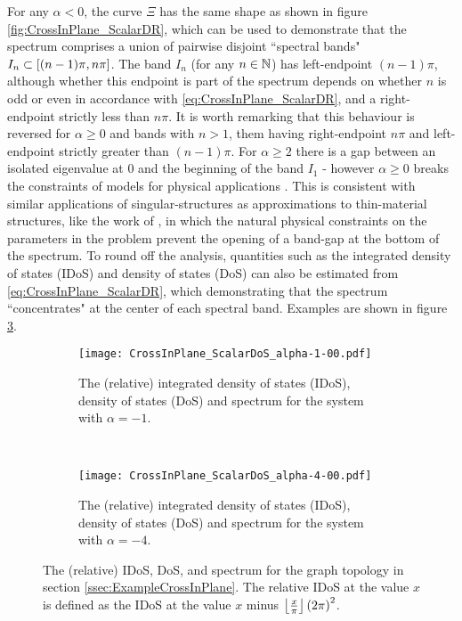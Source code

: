 For any $\alpha<0$, the curve $\Xi$ has the same shape as shown in figure \ref{fig:CrossInPlane_ScalarDR}, which can be used to demonstrate that the spectrum comprises a union of pairwise disjoint ``spectral bands" $I_n\subset\left[ (n-1)\pi, n\pi \right]$.
The band $I_n$ (for any $n\in\mathbb{N}$) has left-endpoint $(n-1)\pi$, although whether this endpoint is part of the spectrum depends on whether $n$ is odd or even in accordance with \eqref{eq:CrossInPlane_ScalarDR}, and a right-endpoint strictly less than $n\pi$.
It is worth remarking that this behaviour is reversed for $\alpha\geq 0$ and bands with $n>1$, them having right-endpoint $n\pi$ and left-endpoint strictly greater than $(n-1)\pi$.
For $\alpha\geq2$ there is a gap between an isolated eigenvalue at $0$ and the beginning of the band $I_1$ - however $\alpha\geq0$ breaks the constraints of models for physical applications .
This is consistent with similar applications of singular-structures as approximations to thin-material structures, like the work of \cite{cherednichenko2019time}, in which the natural physical constraints on the parameters in the problem prevent the opening of a band-gap at the bottom of the spectrum.
To round off the analysis, quantities such as the integrated density of states (IDoS) and density of states (DoS) can also be estimated from \eqref{eq:CrossInPlane_ScalarDR}, which demonstrating that the spectrum ``concentrates" at the center of each spectral band.
Examples are shown in figure \ref{fig:CrossInPlane_ScalarDoS}.
\begin{figure}[h]
	\begin{subfigure}[t]{0.45\textwidth}
		\centering
		\texttt{[image: CrossInPlane\_ScalarDoS\_alpha-1-00.pdf]}
		\caption{\label{fig:CrossInPlane_ScalarDoS_alpha-1-00} The (relative) integrated density of states (IDoS), density of states (DoS) and spectrum for the system with $\alpha=-1$.}
	\end{subfigure}
	~
	\begin{subfigure}[t]{0.45\textwidth}
		\centering
		\texttt{[image: CrossInPlane\_ScalarDoS\_alpha-4-00.pdf]}
		\caption{\label{fig:CrossInPlane_ScalarDoS_alpha-4-00} The (relative) integrated density of states (IDoS), density of states (DoS) and spectrum for the system with $\alpha=-4$.}
	\end{subfigure}	
	\caption{\label{fig:CrossInPlane_ScalarDoS} The (relative) IDoS, DoS, and spectrum for the graph topology in section \ref{ssec:ExampleCrossInPlane}.
	The relative IDoS at the value $x$ is defined as the IDoS at the value $x$ minus $\left\lfloor\frac{x}{\pi}\right\rfloor\left( 2\pi \right)^2$.}
\end{figure}